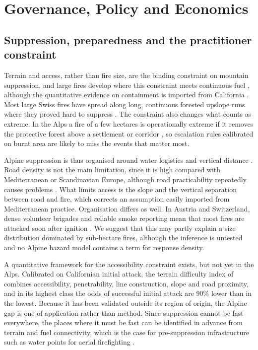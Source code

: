 \documentclass[11pt,a4paper]{article}
\begin{document}
\section{Governance, Policy and Economics}
\label{sec:governance}

\subsection{Suppression, preparedness and the practitioner constraint}

Terrain and access, rather than fire size, are the binding constraint on mountain suppression, and large fires develop where this constraint meets continuous fuel \citep{muller_forest_2020, conedera_linking_2024, cardil_assessing_2025}, although the quantitative evidence on containment is imported from California \citep{cardil_assessing_2025}. Most large Swiss fires have spread along long, continuous forested upslope runs where they proved hard to suppress \citep{conedera_linking_2024}. The constraint also changes what counts as extreme. In the Alps a fire of a few hectares is operationally extreme if it removes the protective forest above a settlement or corridor \citep{muller_forest_2020}, so escalation rules calibrated on burnt area are likely to miss the events that matter most.

Alpine suppression is thus organised around water logistics and vertical distance \citep{muller_forest_2020}. Road density is not the main limitation, since it is high compared with Mediterranean or Scandinavian Europe, although road practicability repeatedly causes problems \citep{muller_forest_2020}. What limits access is the slope and the vertical separation between road and fire, which corrects an assumption easily imported from Mediterranean practice. Organisation differs as well. In Austria and Switzerland, dense volunteer brigades and reliable smoke reporting mean that most fires are attacked soon after ignition \citep{muller_forest_2020}. We suggest that this may partly explain a size distribution dominated by sub-hectare fires, although the inference is untested and no Alpine hazard model contains a term for response density.

A quantitative framework for the accessibility constraint exists, but not yet in the Alps. Calibrated on Californian initial attack, the terrain difficulty index of \citet{cardil_assessing_2025} combines accessibility, penetrability, line construction, slope and road proximity, and in its highest class the odds of successful initial attack are 90\% lower than in the lowest. Because it has been validated outside its region of origin, the Alpine gap is one of application rather than method. Since suppression cannot be fast everywhere, the places where it must be fast can be identified in advance from terrain and fuel connectivity, which is the case for pre-suppression infrastructure such as water points for aerial firefighting \citep{conedera_linking_2024}.
\end{document}
